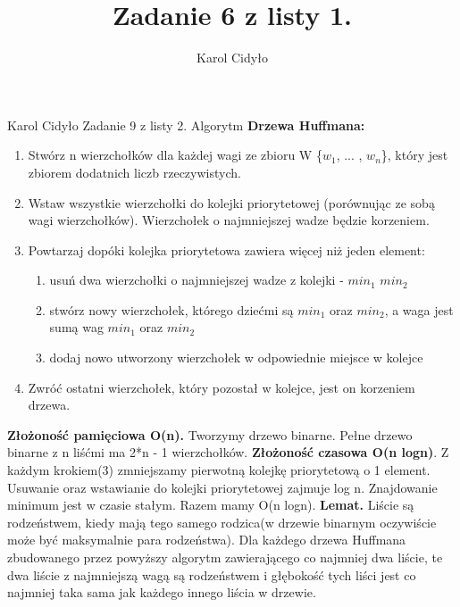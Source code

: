 \documentclass[a4paper,10pt]{article}
\author{Karol Cidyło}
\title {Zadanie 6 z listy 1.}
\begin{document}
Karol Cidyło \newline \newline \newline
Zadanie 9 z listy 2. \newline \newline
Algorytm \newline
\textbf{Drzewa Huffmana:} \newline
\begin{enumerate}
	\item  Stwórz n wierzchołków dla każdej wagi ze zbioru W \{$w_1$, ... , $w_n$\}, który jest zbiorem dodatnich liczb rzeczywistych.
	\item Wstaw wszystkie wierzchołki do kolejki priorytetowej (porównując ze sobą wagi wierzchołków). Wierzchołek o najmniejszej wadze będzie korzeniem.
	\item Powtarzaj dopóki kolejka priorytetowa zawiera więcej niż jeden element:
	\begin{enumerate}
		\item usuń dwa wierzchołki o najmniejszej wadze z kolejki - $min_1$ $min_2$
		\item stwórz nowy wierzchołek, którego dziećmi są  $min_1$ oraz $min_2$, a waga jest sumą wag $min_1$ oraz $min_2$
		\item dodaj nowo utworzony wierzchołek w odpowiednie miejsce w kolejce
	\end{enumerate}
	\item Zwróć ostatni wierzchołek, który pozostał w kolejce, jest on korzeniem drzewa.
\end{enumerate}
\textbf{Złożoność pamięciowa O(n).} Tworzymy drzewo binarne. Pełne drzewo binarne z n liśćmi ma 2*n - 1 wierzchołków. \newline 
\textbf{Złożoność czasowa O(n logn)}. Z każdym krokiem(3)  zmniejszamy pierwotną kolejkę priorytetową o 1 element. Usuwanie oraz wstawianie do kolejki  priorytetowej zajmuje log n. Znajdowanie minimum jest w czasie stałym. Razem mamy O(n logn). \newline \newline
\textbf{Lemat.} \newline 
Liście są rodzeństwem, kiedy mają tego samego rodzica(w drzewie binarnym oczywiście może być maksymalnie para rodzeństwa). \newline Dla każdego drzewa Huffmana zbudowanego przez powyższy algorytm zawierającego co najmniej dwa liście, te dwa liście z najmniejszą wagą są rodzeństwem i głębokość tych liści jest co najmniej taka sama jak każdego innego liścia w drzewie. \newline \newline
\end{document}
